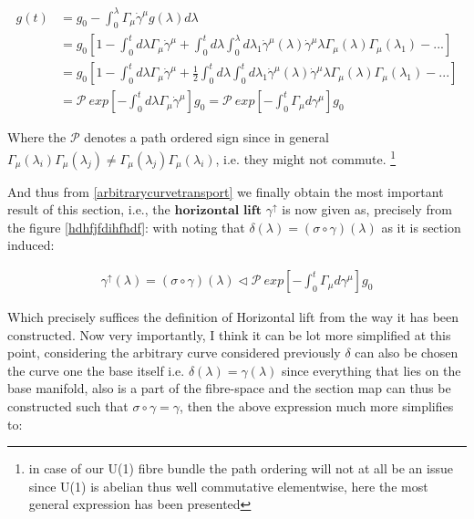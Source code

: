 \documentclass[8pt, twocoloumn]{article}
\begin{document}
\begin{align}
    g(t)& = g_0 - \int_{0}^{\lambda}  \Gamma_{\mu} \dot{\gamma}^{\mu} g(\lambda)d\lambda \\
    & =  g_0  \left[ 1 - \int_{0}^{t} d\lambda \Gamma_{\mu} \dot{\gamma}^{\mu} +  \int_{0}^{t} d\lambda \int^{\lambda}_{0} d\lambda_1 \dot{\gamma}^{\mu}(\lambda)\dot{\gamma}^{\mu}{\lambda} \Gamma_{\mu}(\lambda) \Gamma_{\mu}(\lambda_1)  - . . . \right] \\
    &= g_0 \left[  1 - \int_{0}^{t} d\lambda \Gamma_{\mu} \dot{\gamma}^{\mu} +  \frac{1}{2}\int_{0}^{t} d\lambda \int^{t}_{0} d\lambda_1 \dot{\gamma}^{\mu}(\lambda)\dot{\gamma}^{\mu}{\lambda} \Gamma_{\mu}(\lambda) \Gamma_{\mu}(\lambda_1)  - . . . \right] \\ 
    &=  \mathcal{P} \ exp \left[ - \int_{0}^{t} d\lambda \Gamma_{\mu} \dot{\gamma}^{\mu}\right] g_0= \mathcal{P} \ exp \left[ - \int_{0}^{t} \Gamma_{\mu} d\gamma^{\mu}\right] g_0
\end{align}


Where the $\mathcal{P}$ denotes a path ordered sign since in general $\Gamma_{\mu}(\lambda_i) \Gamma_{\mu}(\lambda_j) \neq \Gamma_{\mu}(\lambda_j) \Gamma_{\mu}(\lambda_i)$, i.e. they might not commute. \footnote{in case of our U(1) fibre bundle the path ordering will not at all be an issue since U(1) is abelian thus well commutative elementwise, here the most general expression has been presented} 

And thus from \ref{arbitrarycurvetransport} we finally obtain the most important result of this section, i.e., the $\textbf{horizontal lift}$ $\gamma^{\uparrow}$ is now given as, precisely from the figure \ref{hdhfjfdihfhdf}: with noting that $\delta(\lambda) = (\sigma \circ \gamma)(\lambda)$ as it is section induced:

\begin{align}
    \gamma^{\uparrow}(\lambda) = (\sigma \circ \gamma)(\lambda) \vartriangleleft \mathcal{P} \ exp \left[ - \int_{0}^{t} \Gamma_{\mu} d\gamma^{\mu}\right] g_0
\end{align}

Which precisely suffices the definition of Horizontal lift from the way it has been constructed. Now very importantly, I think it can be lot more simplified at this point, considering the arbitrary curve considered previously $\delta$ can also be chosen the curve one the base itself i.e. $\delta(\lambda) = \gamma(\lambda)$ since everything that lies on the base manifold, also is a part of the fibre-space and the section map can thus be constructed such that $\sigma \circ \gamma = \gamma$, then the above expression much more simplifies to:
\end{document}
